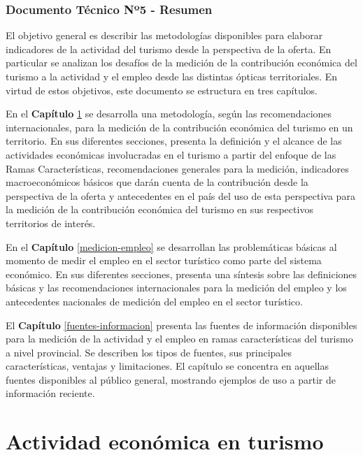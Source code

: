 \documentclass[
  openany]{book}
\begin{document}
\hypertarget{documento-tuxe9cnico-nuxba5---resumen}{%
\subsection*{Documento Técnico Nº5 - Resumen}\label{documento-tuxe9cnico-nuxba5---resumen}}

El objetivo general es describir las metodologías disponibles para elaborar indicadores de la actividad del turismo desde la perspectiva de la oferta. En particular se analizan los desafíos de la medición de la contribución económica del turismo a la actividad y el empleo desde las distintas ópticas territoriales. En virtud de estos objetivos, este documento se estructura en tres capítulos.

En el \textbf{Capítulo} \ref{medicion-actividad} se desarrolla una metodología, según las recomendaciones internacionales, para la medición de la contribución económica del turismo en un territorio. En sus diferentes secciones, presenta la definición y el alcance de las actividades económicas involucradas en el turismo a partir del enfoque de las Ramas Características, recomendaciones generales para la medición, indicadores macroeconómicos básicos que darán cuenta de la contribución desde la perspectiva de la oferta y antecedentes en el país del uso de esta perspectiva para la medición de la contribución económica del turismo en sus respectivos territorios de interés.

En el \textbf{Capítulo} \ref{medicion-empleo} se desarrollan las problemáticas básicas al momento de medir el empleo en el sector turístico como parte del sistema económico. En sus diferentes secciones, presenta una síntesis sobre las definiciones básicas y las recomendaciones internacionales para la medición del empleo y los antecedentes nacionales de medición del empleo en el sector turístico.

El \textbf{Capítulo} \ref{fuentes-informacion} presenta las fuentes de información disponibles para la medición de la actividad y el empleo en ramas características del turismo a nivel provincial. Se describen los tipos de fuentes, sus principales características, ventajas y limitaciones. El capítulo se concentra en aquellas fuentes disponibles al público general, mostrando ejemplos de uso a partir de información reciente.

\hypertarget{medicion-actividad}{%
\chapter{\texorpdfstring{\textbf{Actividad económica en turismo}}{Actividad económica en turismo}}\label{medicion-actividad}}
\end{document}
